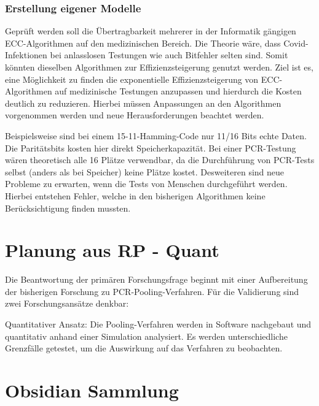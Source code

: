 \subsubsection{Erstellung eigener Modelle}
Geprüft werden soll die Übertragbarkeit mehrerer in der Informatik gängigen ECC-Algorithmen auf den medizinischen Bereich.
Die Theorie wäre, dass Covid-Infektionen bei anlasslosen Testungen wie auch Bitfehler selten sind.
Somit könnten dieselben Algorithmen zur Effizienzsteigerung genutzt werden.
Ziel ist es, eine Möglichkeit zu finden die exponentielle Effizienzsteigerung von ECC-Algorithmen auf medizinische Testungen anzupassen und hierdurch die Kosten deutlich zu reduzieren.
Hierbei müssen Anpassungen an den Algorithmen vorgenommen werden und neue Herausforderungen beachtet werden.

Beispielsweise sind bei einem 15-11-Hamming-Code nur 11/16 Bits echte Daten.
Die Paritätsbits kosten hier direkt Speicherkapazität.
Bei einer PCR-Testung wären theoretisch alle 16 Plätze verwendbar, da die Durchführung von PCR-Tests selbst (anders als bei Speicher) keine Plätze kostet.
Desweiteren sind neue Probleme zu erwarten, wenn die Tests von Menschen durchgeführt werden.
Hierbei entstehen Fehler, welche in den bisherigen Algorithmen keine Berücksichtigung finden mussten.


\section{Planung aus RP - Quant}
Die Beantwortung der primären Forschungsfrage beginnt mit einer Aufbereitung der bisherigen Forschung zu PCR-Pooling-Verfahren.
Für die Validierung sind zwei Forschungsansätze denkbar:

Quantitativer Ansatz:
Die Pooling-Verfahren werden in Software nachgebaut und quantitativ anhand einer Simulation analysiert.
Es werden unterschiedliche Grenzfälle getestet, um die Auswirkung auf das Verfahren zu beobachten.


\section{Obsidian Sammlung}
\fi
